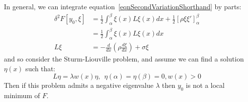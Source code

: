 \documentclass[../Main.tex]{subfiles}
\begin{document}
In general, we can integrate equation~\ref{eqnSecondVariationShorthand} by parts:
\begin{align*}
    \delta^2 F[y_0, \xi] &= \frac{1}{2} \int_\alpha^\beta \xi(x) L\xi(x) dx + \frac{1}{2} \left[\rho \xi \xi'\right]_\alpha^\beta \\
    &= \frac{1}{2} \int_\alpha^\beta \xi(x) L\xi(x) dx \\
    L\xi &= -\frac{d}{dx} \left(\rho \frac{d\xi}{dx}\right) + \sigma \xi
\end{align*}
and so consider the Sturm-Liouville problem, and assume we can find a solution $\eta(x)$ such that:
\begin{equation*}
    L\eta = \lambda w(x) \eta,~~\eta(\alpha) = \eta(\beta) = 0, w(x) > 0
\end{equation*}
Then if this problem admits a negative eigenvalue $\lambda$ then $y_0$ is not a local minimum of $F$.
\end{document}
